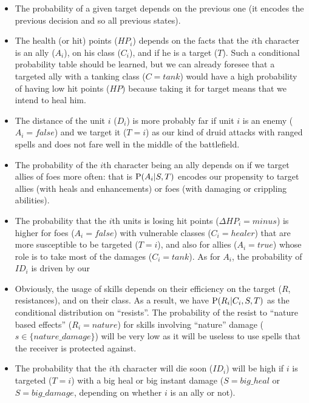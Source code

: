 \begin{itemize}
    \item The probability of a given target depends on the previous one (it encodes the previous decision and so all previous states). 
    \item The health (or hit) points ($HP_i$) depends on the facts that the $i$th character is an ally ($A_i$), on his class ($C_i$), and if he is a target ($T$). Such a conditional probability table should be learned, but we can already foresee that a targeted ally with a tanking class ($C=tank$) would have a high probability of having low hit points ($HP$) because taking it for target means that we intend to heal him.
    \item The distance of the unit $i$ ($D_i$) is more probably far if unit $i$ is an enemy ($A_i=false$) and we target it ($T=i$) as our kind of druid attacks with ranged spells and does not fare well in the middle of the battlefield.
    \item The probability of the $i$th character being an ally depends on if we target allies of foes more often: that is $\mathrm{P}(A_i|S,T)$ encodes our propensity to target allies (with heals and enhancements) or foes (with damaging or crippling abilities).
    \item The probability that the $i$th units is losing hit points ($\Delta HP_i=minus$) is higher for foes ($A_i=false$) with vulnerable classes ($C_i=healer$) that are more susceptible to be targeted ($T=i$), and also for allies ($A_i=true$) whose role is to take most of the damages ($C_i=tank$). As for $A_i$, the probability of $ID_i$ is driven by our %
    \item Obviously, the usage of skills depends on their efficiency on the target ($R$, resistances), and on their class. As a result, we have $\mathrm{P}(R_i|C_i,S,T)$ as the conditional distribution on ``resists''. The probability of the resist to ``nature based effects'' ($R_i=nature$) for skills involving ``nature'' damage ($s \in \{nature\_damage\}$) will be very low as it will be useless to use spells that the receiver is protected against.
    \item The probability that the $i$th character will die soon ($ID_i$) will be high if $i$ is targeted ($T=i$) with a big heal or big instant damage ($S=big\_heal$ or $S=big\_damage$, depending on whether $i$ is an ally or not). 

\end{itemize}
